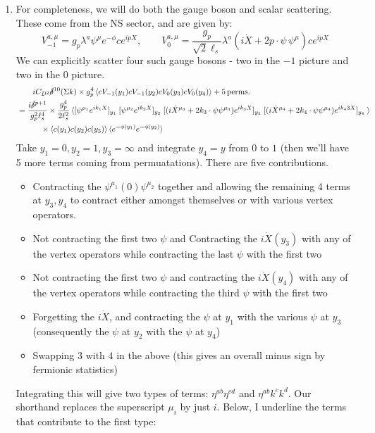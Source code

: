 \documentclass[11pt, class=article, crop=false]{standalone}
\begin{document}
\begin{enumerate}
	\item For completeness, we will do both the gauge boson and scalar scattering. These come from the NS sector, and are given by:
	\[
		V_{-1}^{a, \mu} = g_p \lambda^a \psi^\mu e^{-\phi} c e^{i p X}, \qquad
		V_{0}^{a, \mu} = \frac{g_p}{\sqrt 2 \ell_s} \lambda^a (i \dot X + 2 p \cdot \psi \, \psi^\mu) c e^{i p X}
	\]
	We can explicitly scatter four such gauge bosons - two in the $-1$ picture and two in the $0$ picture.
	\[
	\begin{aligned}
		& \qquad i C_{D^2} \cancel\delta^{10}(\Sigma k) \times g_p^4 \braket{c V_{-1}(y_1) c V_{-1}(y_2) c V_{0}(y_3) c V_{0}(y_4)} + 5 \,\mathrm{perms.} \\
		& = \frac{i \cancel\delta^{p+1}}{g_p^2 \ell_s^4} \times \frac{g_p^4}{2\ell_s^2} \braket{[\psi^{\mu_1} e^{ik_1 X}]_{y_1}\;
		 [\psi^{\mu_2} e^{ik_2 X}]_{y_2} \;
		[(i {\dot X}^{\mu_3} + 2 k_3 \cdot \psi \psi^{\mu_3}) e^{i k_3 X}]_{y_3}\;
		[(i {\dot X}^{\mu_4} + 2 k_4 \cdot \psi \psi^{\mu_4}) e^{i k_43 X}]_{y_4}\;
		  }  \\ & \qquad  \quad \times \braket{c(y_1) c(y_2) c(y_3)} \braket{e^{-\phi(y_1)} e^{- \phi(y_2)}}
	\end{aligned}
	\]
	Take $y_1 = 0, y_2 = 1, y_3 = \infty$ and integrate $y_4 = y$ from $0$ to $1$ (then we'll have 5 more terms coming from permuatations). There are five contributions. 
	\begin{itemize}
		\item Contracting the $\psi^{\mu_1}(0) \psi^{\mu_2}$ together and allowing the remaining 4 terms at $y_3, y_4$ to contract either amongst themselves or with various vertex operators. 
		\item Not contracting the first two $\psi$ and Contracting the $i \dot X(y_3)$ with any of the vertex operators while contracting the last $\psi$ with the first two
		\item Not contracting the first two $\psi$ and contracting the $i \dot X(y_4)$ with any of the vertex operators while contracting the third $\psi$ with the first two
		\item Forgetting the $i \dot X$, and contracting the $\psi$ at $y_1$ with the various $\psi$ at $y_3$ (consequently the $\psi$ at $y_2$ with the $\psi$ at $y_4$)
		\item Swapping $3$ with $4$ in the above (this gives an overall minus sign by fermionic statistics)
	\end{itemize}
	Integrating this will give two types of terms: $\eta^{ab} \eta^{cd}$ and $\eta^{ab} k^c k^d$. Our shorthand replaces the superscript $\mu_i$ by just  $i$. Below, I underline the terms that contribute to the first type:

\end{enumerate}
\end{document}
